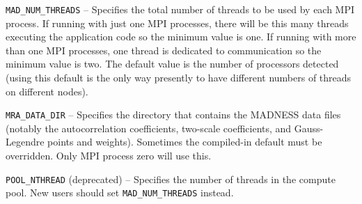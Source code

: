 \texttt{MAD\_NUM\_THREADS} -- Specifies the total number of threads to be used by each MPI process. If running with just
one MPI processes, there will be this many threads executing the application code so the minimum value is one. If
running with more than one MPI processes, one thread is dedicated to communication so the minimum value is two. The
default value is the number of processors detected (using this default is the only way presently to have different
numbers of threads on different nodes).

\texttt{MRA\_DATA\_DIR} -- Specifies the directory that contains the MADNESS data files (notably the autocorrelation
coefficients, two-scale coefficients, and Gauss-Legendre points and weights). Sometimes the compiled-in default must be
overridden. Only MPI process zero will use this.

\texttt{POOL\_NTHREAD} (deprecated) -- Specifies the number of threads in the compute pool. New users should set
\texttt{MAD\_NUM\_THREADS} instead.
